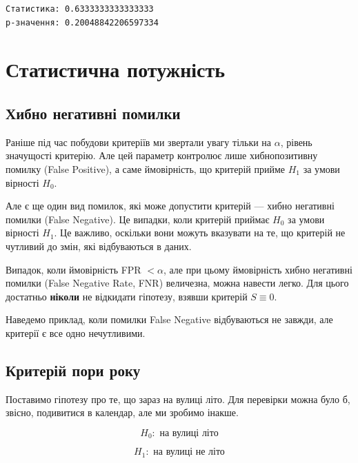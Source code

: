 \documentclass[
  letterpaper,
  10pt,
  openany]{report}
\theoremstyle{definition}
\theoremstyle{remark}
\begin{document}
\begin{verbatim}
Статистика: 0.6333333333333333
p-значення: 0.20048842206597334
\end{verbatim}

\section{Статистична
потужність}\label{ux441ux442ux430ux442ux438ux441ux442ux438ux447ux43dux430-ux43fux43eux442ux443ux436ux43dux456ux441ux442ux44c}

\subsection{Хибно негативні
помилки}\label{ux445ux438ux431ux43dux43e-ux43dux435ux433ux430ux442ux438ux432ux43dux456-ux43fux43eux43cux438ux43bux43aux438}

Раніше під час побудови критеріїв ми звертали увагу тільки на
\(\alpha\), рівень значущості критерію. Але цей параметр контролює лише
хибнопозитивну помилку (False Positive), а саме ймовірність, що критерій
прийме \(H_1\) за умови вірності \(H_0\).

Але є ще один вид помилок, які може допустити критерій --- хибно
негативні помилки (False Negative). Це випадки, коли критерій приймає
\(H_0\) за умови вірності \(H_1\). Це важливо, оскільки вони можуть
вказувати на те, що критерій не чутливий до змін, які відбуваються в
даних.

Випадок, коли ймовірність FPR \(< \alpha\), але при цьому ймовірність
хибно негативні помилки (False Negative Rate, FNR) величезна, можна
навести легко. Для цього достатньо \textbf{ніколи} не відкидати
гіпотезу, взявши критерій \(S \equiv 0\).

Наведемо приклад, коли помилки False Negative відбуваються не завжди,
але критерії є все одно нечутливими.

\subsection{Критерій пори
року}\label{ux43aux440ux438ux442ux435ux440ux456ux439-ux43fux43eux440ux438-ux440ux43eux43aux443}

Поставимо гіпотезу про те, що зараз на вулиці літо. Для перевірки можна
було б, звісно, подивитися в календар, але ми зробимо інакше.

\[
H_0: \text{ на вулиці літо}
\]

\[
H_1: \text{ на вулиці не літо}
\]
\end{document}
